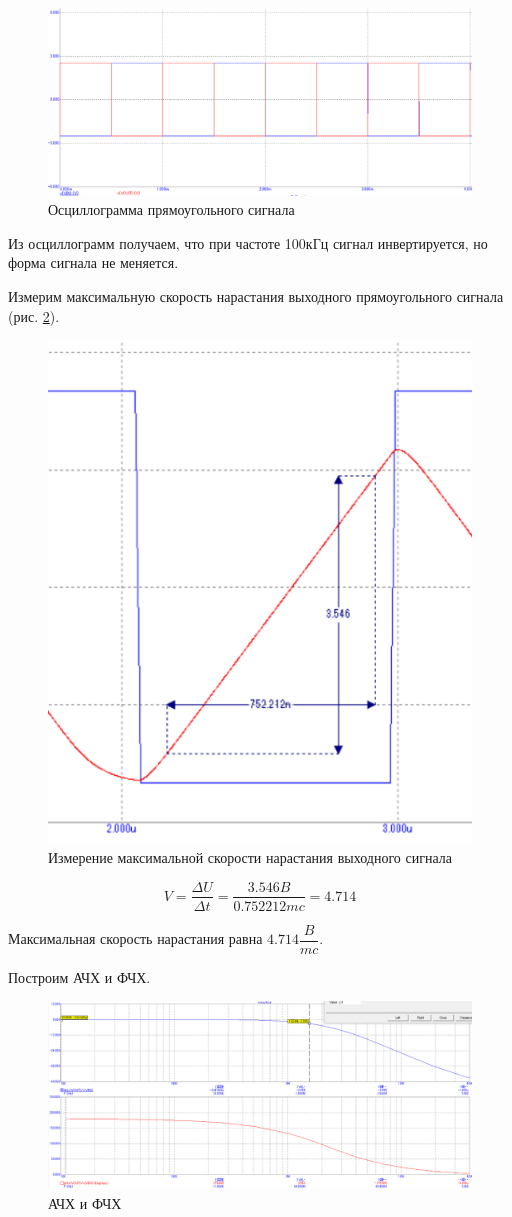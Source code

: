 \documentclass[a4paper,14pt]{article}
\begin{document}
\begin{figure}[H]
	\centering
	\includegraphics[width=0.6\linewidth]{image/graf_1k_rect}
	\caption{Осциллограмма прямоугольного сигнала}
	\label{fig:graf1krect}
\end{figure}

Из осциллограмм получаем, что при частоте 100кГц сигнал инвертируется, но форма сигнала не меняется.

Измерим максимальную скорость нарастания выходного прямоугольного сигнала (рис. \ref{fig:makssk}).

\begin{figure}[H]
	\centering
	\includegraphics[width=0.5\linewidth]{image/maks_sk}
	\caption{Измерение максимальной скорости нарастания выходного сигнала}
	\label{fig:makssk}
\end{figure}

$$V = \dfrac{\Delta U}{\Delta t} = \dfrac{3.546B}{0.752212mc} = 4.714$$

Максимальная скорость нарастания равна $4.714\dfrac{B}{mc}$.

Построим АЧХ и ФЧХ.

\begin{figure}[H]
	\centering
	\includegraphics[width=0.7\linewidth]{image/ACHFH}
	\caption{АЧХ и ФЧХ}
	\label{fig:achfh}
\end{figure}
\end{document}
